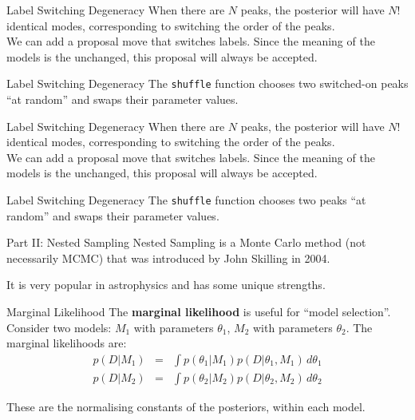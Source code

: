 \begin{frame}[t]{Label Switching Degeneracy}
When there are $N$ peaks, the posterior will have $N!$ identical modes,
corresponding to switching the order of the peaks.\\

\vspace{20pt}
We can add a proposal move that switches labels. Since the meaning of the
models is the unchanged, this proposal will always be accepted. 
\end{frame}


\begin{frame}[t]{Label Switching Degeneracy}
The {\tt shuffle} function chooses two switched-on peaks ``at random''
and swaps their parameter values.
\end{frame}

\begin{frame}[t]{Label Switching Degeneracy}
When there are $N$ peaks, the posterior will have $N!$ identical modes,
corresponding to switching the order of the peaks.\\

\vspace{20pt}
We can add a proposal move that switches labels. Since the meaning of the
models is the unchanged, this proposal will always be accepted. 
\end{frame}


\begin{frame}[t]{Label Switching Degeneracy}
The {\tt shuffle} function chooses two peaks ``at random''
and swaps their parameter values.
\end{frame}



\begin{frame}[t]{Part II: Nested Sampling}
Nested Sampling is a Monte Carlo method (not necessarily MCMC) that was
introduced by John Skilling in 2004.

It is very popular in astrophysics and has some unique strengths.
\end{frame}


\begin{frame}[t]{Marginal Likelihood}
The {\bf marginal likelihood} is useful for ``model selection''. Consider
two models: $M_1$ with parameters $\theta_1$, $M_2$ with parameters $\theta_2$.
The marginal likelihoods are:
\begin{eqnarray*}
p(D | M_1) &=& \int p(\theta_1 | M_1) p(D | \theta_1, M_1) \, d\theta_1\\
p(D | M_2) &=& \int p(\theta_2 | M_2) p(D | \theta_2, M_2) \, d\theta_2
\end{eqnarray*}

These are the normalising constants of the posteriors, within each model.
\end{frame}



